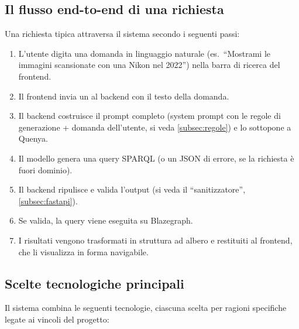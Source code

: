   \subsection{Il flusso end-to-end di una richiesta}\label{subsec:flusso_e2e}

    Una richiesta tipica attraversa il sistema secondo i seguenti passi:

    \begin{enumerate}
      \item L'utente digita una domanda in linguaggio naturale (es.\ ``Mostrami le immagini scansionate con una Nikon nel 2022'') nella barra di ricerca del frontend.
      \item Il frontend invia un  al backend con il testo della domanda.
      \item Il backend costruisce il prompt completo (system prompt con le regole di generazione + domanda dell'utente, si veda \cref{subsec:regole}) e lo sottopone a Quenya.\@
      \item Il modello genera una query SPARQL (o un JSON di errore, se la richiesta è fuori dominio).
      \item Il backend ripulisce e valida l'output (si veda il ``sanitizzatore'', \cref{subsec:fastapi}).
      \item Se valida, la query viene eseguita su Blazegraph.
      \item I risultati vengono trasformati in struttura ad albero e restituiti al frontend, che li visualizza in forma navigabile.
    \end{enumerate}
    \newpage
  \subsection{Scelte tecnologiche principali}\label{subsec:scelte_tech}
    Il sistema combina le seguenti tecnologie, ciascuna scelta per ragioni specifiche legate ai vincoli del progetto:

